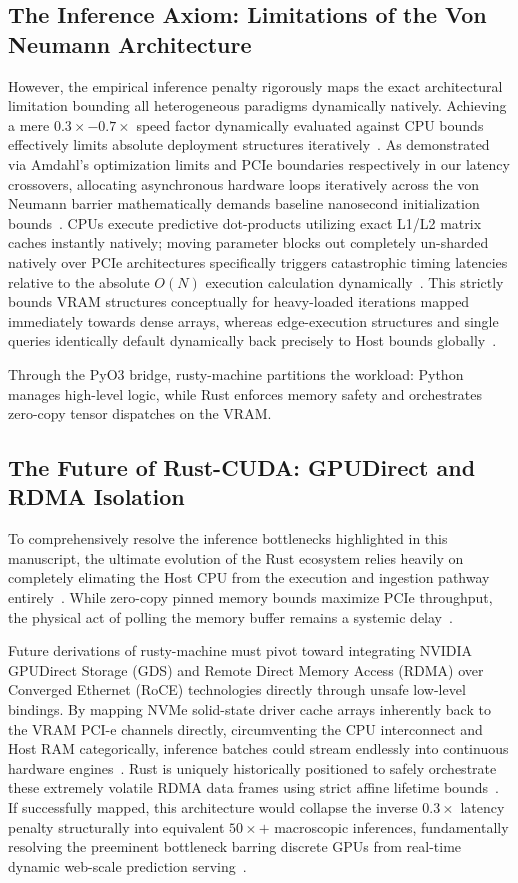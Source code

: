 \documentclass[conference]{IEEEtran}
\begin{document}
\subsection{The Inference Axiom: Limitations of the Von Neumann Architecture}
However, the empirical inference penalty rigorously maps the exact architectural limitation bounding all heterogeneous paradigms dynamically natively. Achieving a mere $0.3\times - 0.7\times$ speed factor dynamically evaluated against CPU bounds effectively limits absolute deployment structures iteratively~\cite{ref12}. As demonstrated via Amdahl’s optimization limits and PCIe boundaries respectively in our latency crossovers, allocating asynchronous hardware loops iteratively across the von Neumann barrier mathematically demands baseline nanosecond initialization bounds~\cite{ref22,ref23}. CPUs execute predictive dot-products utilizing exact L1/L2 matrix caches instantly natively; moving parameter blocks out completely un-sharded natively over PCIe architectures specifically triggers catastrophic timing latencies relative to the absolute $O(N)$ execution calculation dynamically~\cite{ref16}. This strictly bounds VRAM structures conceptually for heavy-loaded iterations mapped immediately towards dense arrays, whereas edge-execution structures and single queries identically default dynamically back precisely to Host bounds globally~\cite{ref6,ref24,ref9}.

Through the PyO3 bridge, rusty-machine partitions the workload: Python manages high-level logic, while Rust enforces memory safety and orchestrates zero-copy tensor dispatches on the VRAM.
\subsection{The Future of Rust-CUDA: GPUDirect and RDMA Isolation}
To comprehensively resolve the inference bottlenecks highlighted in this manuscript, the ultimate evolution of the Rust ecosystem relies heavily on completely elimating the Host CPU from the execution and ingestion pathway entirely~\cite{ref30}. While zero-copy pinned memory bounds maximize PCIe throughput, the physical act of polling the memory buffer remains a systemic delay~\cite{ref11}.

Future derivations of rusty-machine must pivot toward integrating NVIDIA GPUDirect Storage (GDS) and Remote Direct Memory Access (RDMA) over Converged Ethernet (RoCE) technologies directly through unsafe low-level bindings. By mapping NVMe solid-state driver cache arrays inherently back to the VRAM PCI-e channels directly, circumventing the CPU interconnect and Host RAM categorically, inference batches could stream endlessly into continuous hardware engines~\cite{ref19}. Rust is uniquely historically positioned to safely orchestrate these extremely volatile RDMA data frames using strict affine lifetime bounds~\cite{ref21}. If successfully mapped, this architecture would collapse the inverse $0.3\times$ latency penalty structurally into equivalent $50\times+$ macroscopic inferences, fundamentally resolving the preeminent bottleneck barring discrete GPUs from real-time dynamic web-scale prediction serving~\cite{ref25}.
\end{document}

